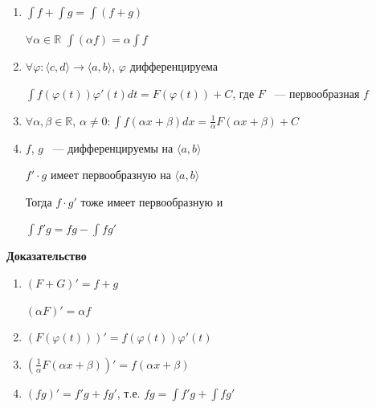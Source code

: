 \documentclass{article}
\begin{document}
		\begin{enumerate}
		
			\item $\int f + \int g  = \int (f + g)$
			
				$\forall \alpha \in \mathbb{R}$ $\int(\alpha f) = \alpha \int{f}$
				
			\item $\forall \varphi: \langle c, d \rangle \rightarrow \langle a, b \rangle$, $\varphi$ дифференцируема
			
				$\int f(\varphi(t))\varphi'(t)dt = F(\varphi(t)) + C$, где $F$ ~--- первообразная $f$
				
			\item $\forall \alpha, \beta \in \mathbb{R}$, $\alpha \neq 0 : \int f(\alpha x + \beta)dx = \frac{1}{\alpha} F(\alpha x + \beta) + C$
			
			\item $f$, $g$ ~--- дифференцируемы на $\langle a, b \rangle$
			
				$f' \cdot g$ имеет первообразную на $\langle a, b \rangle$
				
				Тогда $f \cdot g'$ тоже имеет первообразную и 
				
				$\int f'g = fg - \int fg'$
				
		\end{enumerate}
			
		\textbf{Доказательство}
		
		\begin{enumerate}
		
			\item $(F + G)' = f + g$
			
				$(\alpha F)' = \alpha f$
				
			\item $(F(\varphi(t)))' = f(\varphi(t))\varphi'(t)$
			
			\item $(\frac{1}{\alpha} F (\alpha x + \beta))' = f(\alpha x + \beta)$
			
			\item $(fg)' = f'g + fg'$, т.е. $fg = \int f'g + \int fg'$
			
		\end{enumerate}
\end{document}
